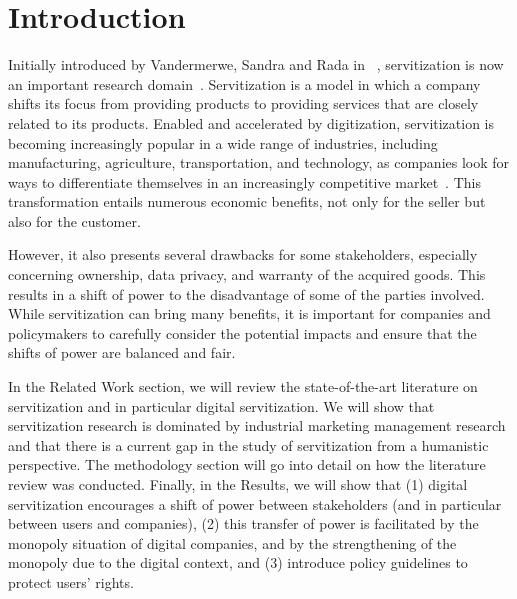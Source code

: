 \documentclass[sigplan,screen,nonacm]{acmart}
\begin{document}
\maketitle

\section{Introduction}
Initially introduced by Vandermerwe, Sandra and Rada in ~\cite{vandermerwe1988servitization}, servitization is now an important research domain~\cite{kowalkowski2017servitization, luoto2017critical}. Servitization is a model in which a company shifts its focus from providing products to providing services that are closely related to its products.
Enabled and accelerated by digitization, servitization is becoming increasingly popular in a wide range of industries, including manufacturing, agriculture, transportation, and technology, as companies look for ways to differentiate themselves in an increasingly competitive market~\cite{luoto2017critical}. This transformation entails numerous economic benefits, not only for the seller but also for the customer. 

However, it also presents several drawbacks for some stakeholders, especially concerning ownership, data privacy, and warranty of the acquired goods.
This results in a shift of power to the disadvantage of some of the parties involved. While servitization can bring many benefits, it is important for companies and policymakers to carefully consider the potential impacts and ensure that the shifts of power are balanced and fair.

In the Related Work section, we will review the state-of-the-art literature on servitization and in particular digital servitization. We will show that servitization research is dominated by industrial marketing management research and that there is a current gap in the study of servitization from a humanistic perspective. The methodology section will go into detail on how the literature review was conducted. Finally, in the Results, we will show that (1) digital servitization encourages a shift of power between stakeholders (and in particular between users and companies), (2) this transfer of power is facilitated by the monopoly situation of digital companies, and by the strengthening of the monopoly due to the digital context, and (3) introduce policy guidelines to protect users' rights.
\end{document}
